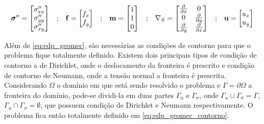 \begin{equation}
\label{eq:vetores2d}
\begin{matrix}
\pmb{\sigma}^{\prime\prime} = \begin{bmatrix}
\sigma^{\prime\prime}_{xx}
\\
\sigma^{\prime\prime}_{yy}
\\
\sigma^{\prime\prime}_{xy}
\end{bmatrix}
&

;

&

\mathbf{f} = \begin{bmatrix}
f_{x}
\\
f_{y}
\end{bmatrix}
&
;
&

\mathbf{m} = \begin{bmatrix} 1 \\ 1 \\ 0\end{bmatrix}

&
;

&
\nabla_S = \begin{bmatrix} \frac{\partial { }}{\partial x} & 0 \\ 0 & \frac{\partial { }}{\partial y} \\ \frac{\partial { }}{\partial y} & \frac{\partial { }}{\partial x} \\ \end{bmatrix}

&
;

&

\mathbf{u} = \begin{bmatrix}
u_x
\\
u_y
\end{bmatrix}

\end{matrix}
\end{equation}

Além de \eqref{eq:edp_geomec}, são necessárias as condições de contorno para que o problema fique totalmente definido. Existem dois principais tipos de condição de contorno a de Dirichlet, onde o deslocamento da fronteira é prescrito e condição de contorno de Neumann, onde a tensão normal a fronteira é prescrita. Considerando $\Omega$ o domínio em que está sendo resolvido o problema e $\Gamma = \partial \Omega$ a fronteira do domínio, pode-se dividi-la em duas partes $\Gamma_u$ e $\Gamma_{\sigma}$, onde $\Gamma_u \cup \Gamma_{\sigma} = \Gamma$, $\Gamma_u \cap \Gamma_{\sigma} = \emptyset$, que possuem condição de Dirichlet e Neumann respectivamente. O problema fica então totalmente definido em \eqref{eq:edp_geomec_contorno}.


